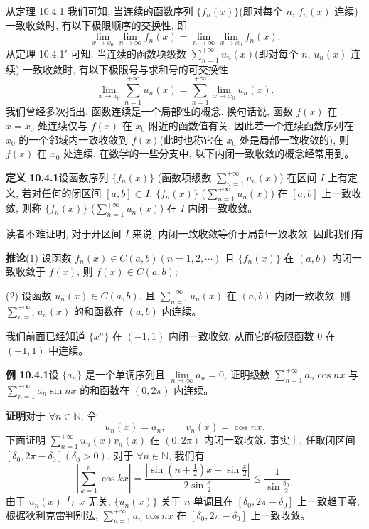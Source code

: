 \documentclass[UTF8,12pt,a4paper,fontset=fandol]{ctexart}
\begin{document}
从定理 10.4.1 我们可知, 当连续的函数序列 $\{f_n(x)\}$(即对每个 $n$, $f_n(x)$ 连续) 一致收敛时, 有以下极限顺序的交换性, 即
\[
  \lim_{x\to x_0}\lim_{n\to\infty}f_n(x)
  =\lim_{n\to\infty}\lim_{x\to x_0}f_n(x).
\]
从定理 10.4.1$'$ 可知, 当连续的函数项级数 $\sum\limits_{n=1}^{+\infty}u_n(x)$(即对每个 $n$, $u_n(x)$ 连续) 一致收敛时, 有以下极限号与求和号的可交换性
\[
  \lim_{x\to x_0}\sum_{n=1}^{+\infty}u_n(x)
  =\sum_{n=1}^{+\infty}\lim_{x\to x_0}u_n(x).
\]
我们曾经多次指出, 函数连续是一个局部性的概念. 换句话说, 函数 $f(x)$ 在 $x=x_0$ 处连续仅与 $f(x)$ 在 $x_0$ 附近的函数值有关. 因此若一个连续函数序列在 $x_0$ 的一个邻域内一致收敛到 $f(x)$(此时也称它在 $x_0$ 处是局部一致收敛的), 则 $f(x)$ 在 $x_0$ 处连续. 在数学的一些分支中, 以下内闭一致收敛的概念经常用到。

\noindent\textbf{定义 10.4.1}\quad 设函数序列 $\{f_n(x)\}$ (函数项级数 $\sum\limits_{n=1}^{+\infty}u_n(x)$) 在区间 $I$ 上有定义, 若对任何的闭区间 $[a,b]\subset I$, $\{f_n(x)\}$ ($\sum\limits_{n=1}^{+\infty}u_n(x)$) 在 $[a,b]$ 上一致收敛, 则称 $\{f_n(x)\}$ ($\sum\limits_{n=1}^{+\infty}u_n(x)$) 在 $I$ 内闭一致收敛。

读者不难证明, 对于开区间 $I$ 来说, 内闭一致收敛等价于局部一致收敛. 因此我们有

\noindent\textbf{推论}\quad (1) 设函数 $f_n(x)\in C(a,b)(n=1,2,\cdots)$ 且 $\{f_n(x)\}$ 在 $(a,b)$ 内闭一致收敛于 $f(x)$, 则 $f(x)\in C(a,b)$;

(2) 设函数 $u_n(x)\in C(a,b)$, 且 $\sum\limits_{n=1}^{+\infty}u_n(x)$ 在 $(a,b)$ 内闭一致收敛, 则 $\sum\limits_{n=1}^{+\infty}u_n(x)$ 的和函数在 $(a,b)$ 内连续。

我们前面已经知道 $\{x^n\}$ 在 $(-1,1)$ 内闭一致收敛, 从而它的极限函数 $0$ 在 $(-1,1)$ 中连续。

\noindent\textbf{例 10.4.1}\quad 设 $\{a_n\}$ 是一个单调序列且 $\lim\limits_{n\to\infty}a_n=0$, 证明级数 $\sum\limits_{n=1}^{+\infty}a_n\cos nx$ 与 $\sum\limits_{n=1}^{+\infty}a_n\sin nx$ 的和函数在 $(0,2\pi)$ 内连续。

\noindent\textbf{证明}\quad 对于 $\forall n\in\mathbb N$, 令
\[
  u_n(x)=a_n,\qquad v_n(x)=\cos nx.
\]
下面证明 $\sum\limits_{n=1}^{+\infty}u_n(x)v_n(x)$ 在 $(0,2\pi)$ 内闭一致收敛. 事实上, 任取闭区间 $[\delta_0,2\pi-\delta_0](\delta_0>0)$, 对于 $\forall n\in\mathbb N$, 我们有
\[
  \left|\sum_{k=1}^n\cos kx\right|
  =\frac{\left|\sin\left(n+\frac12\right)x-\sin\frac{x}{2}\right|}{2\sin\frac{x}{2}}
  \leq\frac1{\sin\frac{\delta_0}{2}}.
\]
由于 $u_n(x)$ 与 $x$ 无关, $\{u_n(x)\}$ 关于 $n$ 单调且在 $[\delta_0,2\pi-\delta_0]$ 上一致趋于零, 根据狄利克雷判别法, $\sum\limits_{n=1}^{+\infty}a_n\cos nx$ 在 $[\delta_0,2\pi-\delta_0]$ 上一致收敛。
\end{document}
